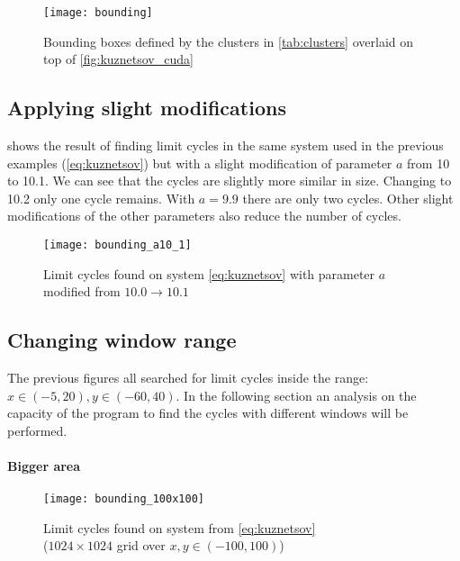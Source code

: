 \begin{figure}[H]
    \centering
    \texttt{[image: bounding]}
    \caption{Bounding boxes defined by the clusters in \cref{tab:clusters}
        overlaid on top of \cref{fig:kuznetsov_cuda}
    }%
    \label{fig:bounding}
\end{figure}

\pagebreak
\subsection{Applying slight modifications}

 shows the result of finding limit cycles in the same
system used in the previous examples (\cref{eq:kuznetsov}) but with a slight modification
of parameter $a$ from 10 to 10.1. We can see that the cycles are slightly more similar in size.
Changing to 10.2 only one cycle remains. With $a = 9.9$ there are only two cycles. Other slight
modifications of the other parameters also reduce the number of cycles.

\begin{figure}[H]
    \centering
    \texttt{[image: bounding\_a10\_1]}
    \caption{Limit cycles found on system \cref{eq:kuznetsov} with parameter
        $a$ modified from $10.0 \to 10.1$
    }%
    \label{fig:bounding_a10_1}
\end{figure}

\pagebreak
\subsection{Changing window range}
The previous figures all searched for limit cycles inside the range:
$x \in (-5, 20), y \in (-60, 40)$. In the following section an analysis on the
capacity of the program to find the cycles with different windows will be performed.

\paragraph{Bigger area}

\begin{figure}[H]
    \centering
    \texttt{[image: bounding\_100x100]}
    \caption{Limit cycles found on system from \cref{eq:kuznetsov} \\
        ($1024 \times 1024$ grid over $x, y \in (-100, 100)$)
    }%
    \label{fig:bounding_100x100}
\end{figure}

